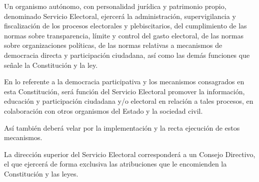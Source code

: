 \documentclass[11pt, a4paper]{article}
\begin{document}
\begin{enumerate}
Un organismo autónomo, con personalidad jurídica y patrimonio propio, denominado Servicio Electoral, ejercerá la administración, supervigilancia y fiscalización de los procesos electorales y plebiscitarios, del cumplimiento de las normas sobre transparencia, límite y control del gasto electoral, de las normas sobre organizaciones políticas, de las normas relativas a mecanismos de democracia directa y participación ciudadana, así como las demás funciones que señale la Constitución y la ley. 

En lo referente a la democracia participativa y los mecanismos consagrados en esta Constitución, será función del Servicio Electoral promover la información, educación y participación ciudadana y/o electoral en relación a tales procesos, en colaboración con otros organismos del Estado y la sociedad civil. 

Así también deberá velar por la implementación y la recta ejecución de estos mecanismos. 

La dirección superior del Servicio Electoral corresponderá a un Consejo Directivo, el que ejercerá de forma exclusiva las atribuciones que le encomienden la Constitución y las leyes. 


\end{enumerate}
\end{document}
